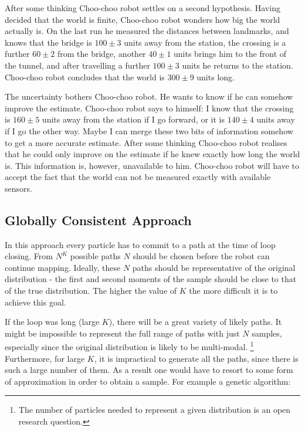 After some thinking Choo-choo robot settles on a second hypothesis.
Having decided that the world is finite, Choo-choo robot wonders how
big the world actually is. On the last run he measured the distances
between landmarks, and knows that the bridge is $100 \pm 3$ units away
from the station, the crossing is a further $60 \pm 2$ from the
bridge, another $40 \pm 1$ units brings him to the front of the
tunnel, and after travelling a further $100 \pm 3$ units he returns to
the station.  Choo-choo robot concludes that the world is $300 \pm 9$
units long.

The uncertainty bothers Choo-choo robot. He wants to know if he can
somehow improve the estimate. Choo-choo robot says to himself: I know
that the crossing is $160 \pm 5$ units away from the station if I go
forward, or it is $140 \pm 4$ units away if I go the other way. Maybe
I can merge these two bits of information somehow to get a more
accurate estimate. After some thinking Choo-choo robot realises that
he could only improve on the estimate if he knew exactly how long the
world is. This information is, however, unavailable to him. Choo-choo
robot will have to accept the fact that the world can not be measured
exactly with available sensors.



\subsection{Globally Consistent Approach}

In this approach every particle has to commit to a path at the time of
loop closing. From $N^K$ possible paths $N$ should be chosen before
the robot can continue mapping. Ideally, these $N$ paths should be
representative of the original distribution - the first
and second moments of the sample should be close to that of the true
distribution. The higher the value of $K$ the more difficult it is
to achieve this goal. 

If the loop was long (large $K$), there will be a great variety of
likely paths. It might be impossible to represent the full range of
paths with just $N$ samples, especially since the original distribution
is likely to be multi-modal.
\footnote{The number of particles needed to represent a given
distribution is an open research question.} Furthermore, for large
$K$, it is impractical to generate all the paths, since there is such
a large number of them. As a result one would have to resort to some
form of approximation in order to obtain a sample. For example a
genetic algorithm: 

